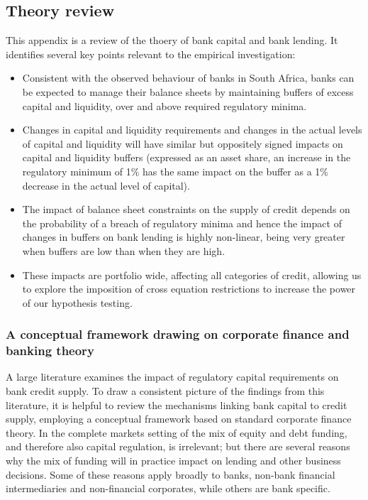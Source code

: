 \documentclass[
  12,
]{article}
\begin{document}
\hypertarget{theory-review}{%
\subsection{Theory review}\label{theory-review}}

This appendix is a review of the thoery of bank capital and bank lending. It identifies several key points relevant to the empirical investigation:

\begin{itemize}
    \item Consistent with the observed behaviour of banks in South Africa, banks can be expected to manage their balance sheets by maintaining buffers of excess capital and liquidity, over and above required regulatory minima.
    \item Changes in capital and liquidity requirements and changes in the actual levels of capital and liquidity will have similar but oppositely signed impacts on capital and liquidity buffers (expressed as an asset share, an increase in the regulatory minimum of 1\% has the same impact on the buffer as a 1\% decrease in the actual level of capital). 
    \item The impact of balance sheet constraints on the supply of credit depends on the probability of a breach of regulatory minima and hence the impact of changes in buffers on bank lending is highly non-linear, being very greater when buffers are low than when they are high. 
    \item These impacts are portfolio wide, affecting all categories of credit, allowing us to explore the imposition of cross equation restrictions to increase the power of our hypothesis testing.  
\end{itemize}

\hypertarget{a-conceptual-framework-drawing-on-corporate-finance-and-banking-theory}{%
\subsubsection{A conceptual framework drawing on corporate finance and banking theory}\label{a-conceptual-framework-drawing-on-corporate-finance-and-banking-theory}}

A large literature examines the impact of regulatory capital requirements on bank credit supply. To draw a consistent picture of the findings from this literature, it is helpful to review the mechanisms linking bank capital to credit supply, employing a conceptual framework based on standard corporate finance theory. In the complete markets setting of \citet{modigliani58} the mix of equity and debt funding, and therefore also capital regulation, is irrelevant; but there are several reasons why the mix of funding will in practice impact on lending and other business decisions. Some of these reasons apply broadly to banks, non-bank financial intermediaries and non-financial corporates, while others are bank specific.
\end{document}
